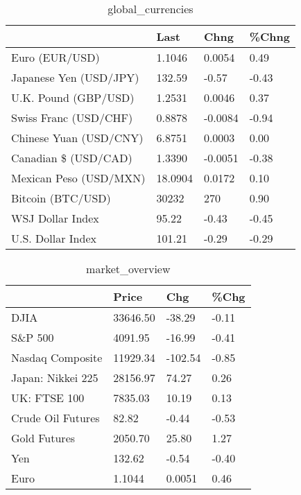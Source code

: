 \documentclass{article}%
\begin{document}
%


\begin{table}[htbp]%
\caption{global\_currencies}%
\centering%
\begin{adjustbox}{width=1\textwidth}%
\begin{tabular}{llll}
\toprule
                       &    Last &    Chng & \%Chng \\
\midrule
        Euro (EUR/USD) &  1.1046 &  0.0054 &  0.49 \\
Japanese Yen (USD/JPY) &  132.59 &   -0.57 & -0.43 \\
  U.K. Pound (GBP/USD) &  1.2531 &  0.0046 &  0.37 \\
 Swiss Franc (USD/CHF) &  0.8878 & -0.0084 & -0.94 \\
Chinese Yuan (USD/CNY) &  6.8751 &  0.0003 &  0.00 \\
  Canadian \$ (USD/CAD) &  1.3390 & -0.0051 & -0.38 \\
Mexican Peso (USD/MXN) & 18.0904 &  0.0172 &  0.10 \\
     Bitcoin (BTC/USD) &   30232 &     270 &  0.90 \\
      WSJ Dollar Index &   95.22 &   -0.43 & -0.45 \\
     U.S. Dollar Index &  101.21 &   -0.29 & -0.29 \\
\bottomrule
\end{tabular}
%
\end{adjustbox}%
\end{table}

%


\begin{table}[htbp]%
\caption{market\_overview}%
\centering%
\begin{adjustbox}{width=1\textwidth}%
\begin{tabular}{llll}
\toprule
                  &    Price &     Chg &  \%Chg \\
\midrule
             DJIA & 33646.50 &  -38.29 & -0.11 \\
          S\&P 500 &  4091.95 &  -16.99 & -0.41 \\
 Nasdaq Composite & 11929.34 & -102.54 & -0.85 \\
Japan: Nikkei 225 & 28156.97 &   74.27 &  0.26 \\
     UK: FTSE 100 &  7835.03 &   10.19 &  0.13 \\
Crude Oil Futures &    82.82 &   -0.44 & -0.53 \\
     Gold Futures &  2050.70 &   25.80 &  1.27 \\
              Yen &   132.62 &   -0.54 & -0.40 \\
             Euro &   1.1044 &  0.0051 &  0.46 \\
\bottomrule
\end{tabular}
%
\end{adjustbox}%
\end{table}

%
\end{document}
